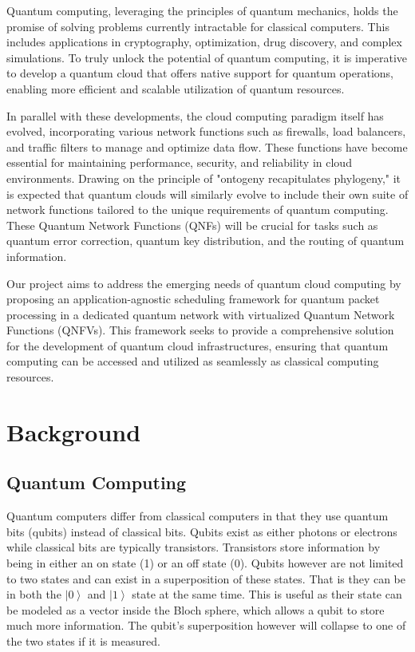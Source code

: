 \documentclass[sigplan,screen]{acmart}
\begin{document}
Quantum computing, leveraging the principles of quantum mechanics, holds the promise of solving problems currently intractable for classical computers. This includes applications in cryptography, optimization, drug discovery, and complex simulations. To truly unlock the potential of quantum computing, it is imperative to develop a quantum cloud that offers native support for quantum operations, enabling more efficient and scalable utilization of quantum resources.

In parallel with these developments, the cloud computing paradigm itself has evolved, incorporating various network functions such as firewalls, load balancers, and traffic filters to manage and optimize data flow. These functions have become essential for maintaining performance, security, and reliability in cloud environments. Drawing on the principle of "ontogeny recapitulates phylogeny," it is expected that quantum clouds will similarly evolve to include their own suite of network functions tailored to the unique requirements of quantum computing. These Quantum Network Functions (QNFs) will be crucial for tasks such as quantum error correction, quantum key distribution, and the routing of quantum information.

Our project aims to address the emerging needs of quantum cloud computing by proposing an application-agnostic scheduling framework for quantum packet processing in a dedicated quantum network with virtualized Quantum Network Functions (QNFVs). This framework seeks to provide a comprehensive solution for the development of quantum cloud infrastructures, ensuring that quantum computing can be accessed and utilized as seamlessly as classical computing resources.

\section{Background}
\subsection{Quantum Computing}
Quantum computers differ from classical computers in that they use quantum bits (qubits) instead of classical bits. 
Qubits exist as either photons or electrons while classical bits are typically transistors. 
Transistors store information by being in either an on state (1) or an off state (0).
Qubits however are not limited to two states and can exist in a superposition of these states.
That is they can be in both the $\left| 0 \right>$ and $\left| 1 \right>$ state at the same time.
This is useful as their state can be modeled as a vector inside the Bloch sphere, which allows a qubit to store much more information.
The qubit's superposition however will collapse to one of the two states if it is measured.\\
\end{document}
